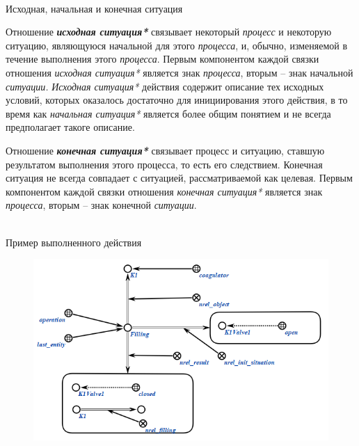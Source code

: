 \begin{frame}{\\Исходная, начальная и конечная ситуация}
\topline
\justifying
\vspace{10mm}

	Отношение \textit{\textbf{исходная ситуация*}} связывает некоторый \textit{процесс} и некоторую ситуацию, являющуюся начальной для этого \textit{процесса}, и, обычно, изменяемой в течение выполнения этого \textit{процесса}.
    Первым компонентом каждой связки отношения \textit{исходная ситуация*} является знак \textit{процесса}, вторым – знак начальной \textit{ситуации.}
    \textit{Исходная ситуация*} действия содержит описание тех исходных условий, которых оказалось достаточно для инициирования этого действия, в то время как \textit{начальная ситуация*} является более общим понятием и не всегда предполагает такоге описание.
    
    \bigskip
    
    Отношение \textit{\textbf{конечная ситуация*}} связывает процесс и ситуацию, ставшую результатом выполнения этого процесса, то есть его следствием. Конечная ситуация не всегда совпадает с ситуацией, рассматриваемой как целевая.
Первым компонентом каждой связки отношения \textit{конечная ситуация*} является знак \textit{процесса}, вторым – знак конечной \textit{ситуации}.
\end{frame}

\begin{frame}{\\Пример выполненного действия}
	\topline
	\justifying
	\vspace{10mm}
	\begin{SCn}
		\begin{figure}[H]
			\includegraphics[scale=0.7]{./figures/sd_temp_entities/process_description.png}
		\end{figure}
	\end{SCn}
\end{frame}

